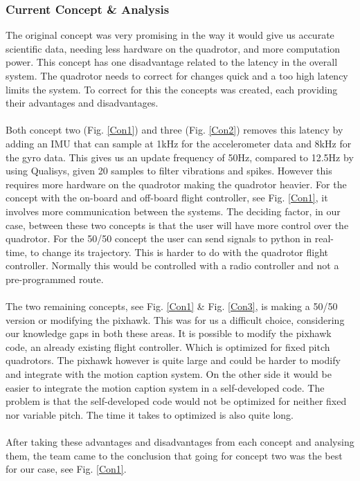 \subsubsection{Current Concept \& Analysis}
The original concept was very promising in the way it would give us accurate scientific data, needing less hardware on the quadrotor, and more computation power. This concept has one disadvantage related to the latency in the overall system. The quadrotor needs to correct for changes quick and a too high latency limits the system. To correct for this the concepts was created, each providing their advantages and disadvantages. 
\\\\
Both concept two (Fig. \ref{Con1}) and three (Fig. \ref{Con2}) removes this latency by adding an IMU that can sample at 1kHz for the accelerometer data and 8kHz for the gyro data. This gives us an update frequency of 50Hz, compared to 12.5Hz by using Qualisys, given 20 samples to filter vibrations and spikes. However this requires more hardware on the quadrotor making the quadrotor heavier. For the concept with the on-board and off-board flight controller, see Fig. \ref{Con1}, it involves more communication between the systems. The deciding factor, in our case, between these two concepts is that the user will have more control over the quadrotor. For the 50/50 concept the user can send signals to python in real-time, to change its trajectory. This is harder to do with the quadrotor flight controller. Normally this would be controlled with a radio controller and not a pre-programmed route. 
\\\\
The two remaining concepts, see Fig. \ref{Con1} \& Fig. \ref{Con3}, is making a 50/50 version or modifying the pixhawk. This was for us a difficult choice, considering our knowledge gaps in both these areas. It is possible to modify the pixhawk code, an already existing flight controller. Which is optimized for fixed pitch quadrotors. The pixhawk however is quite large and could be harder to modify and integrate with the motion caption system. On the other side it would be easier to integrate the motion caption system in a self-developed code. The problem is that the self-developed code would not be optimized for neither fixed nor variable pitch. The time it takes to optimized is also quite long.
\\\\
After taking these advantages and disadvantages from each concept and analysing them, the team came to the conclusion that going for concept two was the best for our case, see Fig. \ref{Con1}. 

